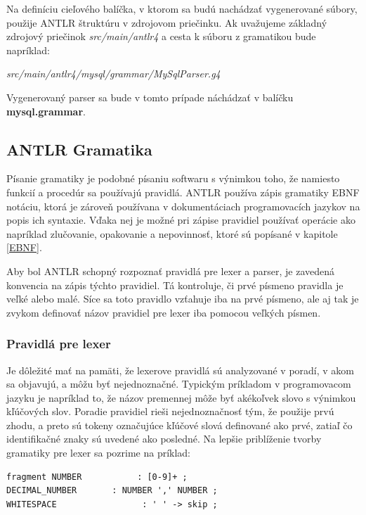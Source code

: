 Na definíciu cieľového balíčka, v ktorom sa budú nachádzať vygenerované súbory, použije \mbox{ANTLR}  štruktúru v zdrojovom priečinku. Ak uvažujeme základný zdrojový priečinok \textit{src/main/antlr4} a cesta k súboru z gramatikou bude napríklad:

\begin{center}
\textit{src/main/antlr4/mysql/grammar/MySqlParser.g4}
\end{center}

Vygenerovaný parser sa bude v tomto prípade náchádzať v balíčku \textbf{mysql.grammar}.

\subsection{ANTLR Gramatika}\label{antlr_grammar}
Písanie gramatiky je podobné písaniu softwaru s výnimkou toho, že namiesto funkcií a procedúr sa používajú pravidlá. ANTLR používa zápis gramatiky EBNF notáciu, ktorá je zároveň používana v dokumentáciach programovacích jazykov na popis ich syntaxie. Vďaka nej je možné pri zápise pravidiel používať operácie ako napríklad zlučovanie, opakovanie a nepovinnosť, ktoré sú popísané v kapitole \ref{EBNF}.

Aby bol ANTLR schopný rozpoznať pravidlá pre lexer a parser, je zavedená konvencia na zápis týchto pravidiel. Tá kontroluje, či prvé písmeno pravidla je veľké alebo malé. Síce sa toto pravidlo vzťahuje iba na prvé písmeno, ale aj tak je zvykom definovať názov pravidiel pre lexer iba pomocou veľkých písmen. 

\subsubsection{Pravidlá pre lexer}
Je dôležité mať na pamäti, že lexerove pravidlá sú analyzované v poradí, v akom sa objavujú, a môžu byť nejednoznačné. Typickým príkladom v programovacom jazyku je napríklad to, že názov premennej môže byť akékoľvek slovo s výnimkou kľúčových slov. Poradie pravidiel rieši nejednoznačnosť tým, že použije prvú zhodu, a preto sú tokeny označujúce kľúčové slová definované ako prvé, zatiaľ čo identifikačné znaky sú uvedené ako posledné. Na lepšie priblíženie tvorby gramatiky pre lexer sa pozrime na príklad:

\begin{lstlisting}[basicstyle=\small, keepspaces=true]
fragment NUMBER           : [0-9]+ ;
DECIMAL_NUMBER       : NUMBER ',' NUMBER ;
WHITESPACE                 : ' ' -> skip ;
\end{lstlisting}


